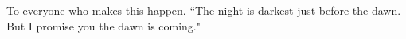 

\begin{acknowledgments}
To everyone who makes this happen. ``The night is darkest just before the dawn. But I promise you the dawn is coming." 
\end{acknowledgments}


\tableofcontents

\listoftables

\listoffigures


